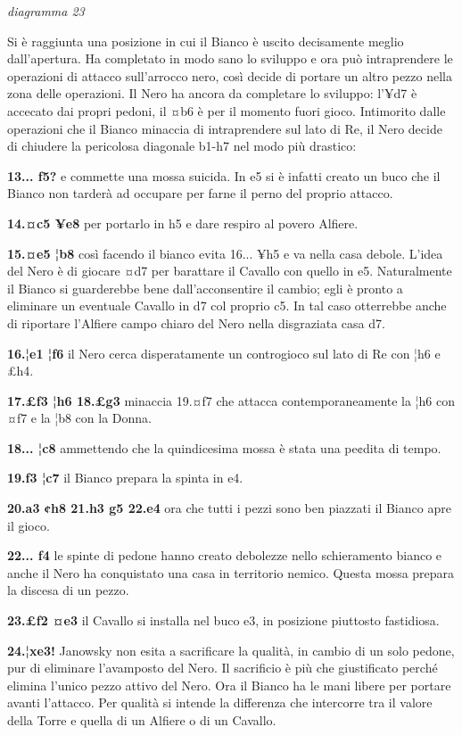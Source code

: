 \documentclass[
]{article}
\begin{document}
\emph{diagramma 23}

Si è raggiunta una posizione in cui il Bianco è uscito decisamente
meglio dall'apertura. Ha completato in modo sano lo sviluppo e ora può
intraprendere le operazioni di attacco sull'arrocco nero, così decide di
portare un altro pezzo nella zona delle operazioni. Il Nero ha ancora da
completare lo sviluppo: l'¥d7 è accecato dai propri pedoni, il ¤b6 è per
il momento fuori gioco. Intimorito dalle operazioni che il Bianco
minaccia di intraprendere sul lato di Re, il Nero decide di chiudere la
pericolosa diagonale b1-h7 nel modo più drastico:

\textbf{13... f5?} e commette una mossa suicida. In e5 si è infatti
creato un buco che il Bianco non tarderà ad occupare per farne il perno
del proprio attacco.

\textbf{14.¤c5 ¥e8} per portarlo in h5 e dare respiro al povero Alfiere.

\textbf{15.¤e5 ¦b8} così facendo il bianco evita 16... ¥h5 e va nella
casa debole. L'idea del Nero è di giocare ¤d7 per barattare il Cavallo
con quello in e5. Naturalmente il Bianco si guarderebbe bene
dall'acconsentire il cambio; egli è pronto a eliminare un eventuale
Cavallo in d7 col proprio c5. In tal caso otterrebbe anche di riportare
l'Alfiere campo chiaro del Nero nella disgraziata casa d7.

\textbf{16.¦e1 ¦f6} il Nero cerca disperatamente un controgioco sul lato
di Re con ¦h6 e £h4.

\textbf{17.£f3 ¦h6 18.£g3} minaccia 19.¤f7 che attacca
contemporaneamente la ¦h6 con ¤f7 e la ¦b8 con la Donna.

\textbf{18... ¦c8} ammettendo che la quindicesima mossa è stata una
pe¢dita di tempo.

\textbf{19.f3 ¦c7} il Bianco prepara la spinta in e4.

\textbf{20.a3 ¢h8 21.h3 g5 22.e4} ora che tutti i pezzi sono ben
piazzati il Bianco apre il gioco.

\textbf{22... f4} le spinte di pedone hanno creato debolezze nello
schieramento bianco e anche il Nero ha conquistato una casa in
territorio nemico. Questa mossa prepara la discesa di un pezzo.

\textbf{23.£f2 ¤e3} il Cavallo si installa nel buco e3, in posizione
piuttosto fastidiosa.

\textbf{24.¦xe3!} Janowsky non esita a sacrificare la qualità, in cambio
di un solo pedone, pur di eliminare l'avamposto del Nero. Il sacrificio
è più che giustificato perché elimina l'unico pezzo attivo del Nero. Ora
il Bianco ha le mani libere per portare avanti l'attacco. Per qualità si
intende la differenza che intercorre tra il valore della Torre e quella
di un Alfiere o di un Cavallo.
\end{document}
